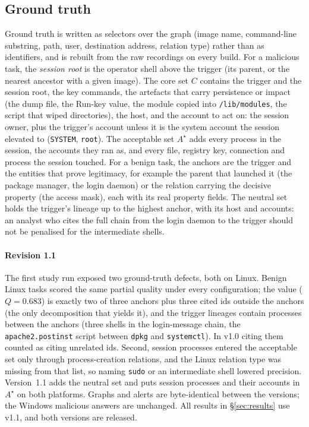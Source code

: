 \subsection{Ground truth}
Ground truth is written as selectors over the graph (image name, command-line substring, path, user,
destination address, relation type) rather than as identifiers, and is rebuilt from the raw recordings on
every build. For a malicious task, the \emph{session root} is the operator shell above the trigger (its parent,
or the nearest ancestor with a given image). The core set $C$ contains the trigger and the session root, the
key commands, the artefacts that carry persistence or impact (the dump file, the Run-key value, the module
copied into \texttt{/lib/modules}, the script that wiped directories), the host, and the account to act on:
the session owner, plus the trigger's account unless it is the system account the session elevated to
(\texttt{SYSTEM}, \texttt{root}). The acceptable set $A^\star$ adds every process in the session, the accounts they ran as, and every
file, registry key, connection and process the session touched. For a benign task, the anchors are the trigger
and the entities that prove legitimacy, for example the parent that launched it (the package manager, the
login daemon) or the relation carrying the decisive property (the access mask), each with its real property
fields. The neutral set holds the trigger's lineage up to the highest anchor, with its host and accounts:
an analyst who cites the full chain from the login daemon to the trigger should not be penalised for the
intermediate shells.

\paragraph{Revision 1.1} The first study run exposed two ground-truth defects, both on Linux. Benign Linux
tasks scored the same partial quality under every configuration; the value ($Q=0.683$) is exactly two of three
anchors plus three cited ids outside the anchors (the only decomposition that yields it), and the trigger
lineages contain processes between the anchors (three shells in the login-message chain, the
\texttt{apache2.postinst} script between \texttt{dpkg} and \texttt{systemctl}). In v1.0 citing them counted as
citing unrelated ids. Second, session processes entered the acceptable set only through
process-creation relations, and the Linux relation type was missing from that list, so naming \texttt{sudo} or
an intermediate shell lowered precision. Version~1.1 adds the neutral set and puts session processes and their
accounts in $A^\star$ on both platforms. Graphs and alerts are byte-identical between the versions; the Windows
malicious answers are unchanged. All results in \S\ref{sec:results} use v1.1, and both versions are released.

